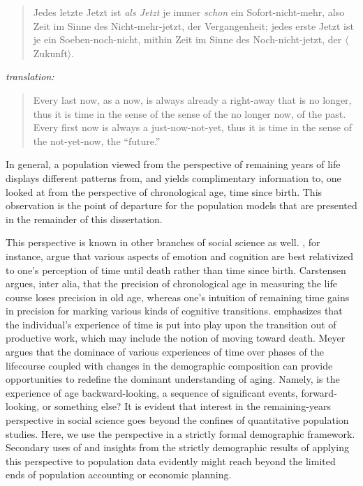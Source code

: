  \FloatBarrier
 \label{ch:newpersp}
\begin{singlespace}
\begin{quote}
Jedes letzte Jetzt ist \textit{als Jetzt} je immer \textit{schon} ein
Sofort-nicht-mehr, also Zeit im Sinne des Nicht-mehr-jetzt, der Vergangenheit;
jedes erste Jetzt ist je ein Soeben-noch-nicht, mithin Zeit im Sinne des
Noch-nicht-jetzt, der $\langle$Zukunft$\rangle$.
\citep{heidegger1977sein}
\end{quote}
\textit{translation:}
\begin{quote}
Every last now, as a now, is always already a right-away that is no longer, thus
it is time in the sense of the sense of the no longer now, of the past. Every
first now is always a just-now-not-yet, thus it is time in the sense of the
not-yet-now, the ``future.'' \citep{stambaugh1996being}
\end{quote}
\end{singlespace}

In general, a population viewed from the
perspective of remaining years of life displays different patterns 
from, and yields complimentary information to, one looked at from the
perspective of chronological age, time since birth. This observation is the
point of departure for the population models that are presented in the remainder
of this dissertation. 

This perspective is known in other branches of social science as well.
 \citet{carstensen2006influence,carstensen1999taking}, 
for instance, argue that various aspects of emotion and cognition are best 
relativized to one's perception of time until
death rather than time since birth. Carstensen argues, inter alia, that the
precision of chronological age in measuring the life course loses precision in old age,
whereas one's intuition of remaining time gains in precision for marking various
kinds of cognitive transitions. \citet{meyer2008altern} emphasizes that the
individual's experience of time is put into play upon the transition out of
productive work, which may include the notion of moving toward death. Meyer
argues that the dominace of various experiences of time over phases of the
lifecourse coupled with changes in the demographic composition can provide
opportunities to redefine the dominant understanding of aging. Namely, is
the experience of age backward-looking, a sequence of significant events,
forward-looking, or something else? It is evident that interest in the
remaining-years perspective in social science goes beyond the
confines of quantitative population studies. Here, we use the perspective in
a strictly formal demographic framework. Secondary uses of and insights from the
strictly demographic results of applying this perspective to population data
evidently might reach beyond the limited ends of population accounting or
economic planning.

